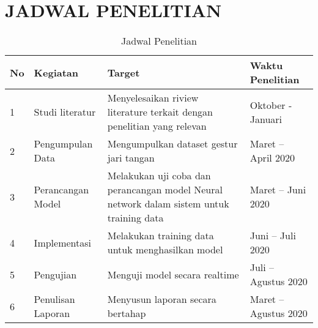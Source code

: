 \chapter{JADWAL PENELITIAN}
\begin{table}[htpb]
	\caption{Jadwal Penelitian}
	\vspace{0.2cm}
	\centering
	\begin{tabular}{|p{0.5cm}|p{4cm}|p{4cm}|p{4cm}|}
		\hline
		No & Kegiatan & Target & Waktu Penelitian \\
		\hline
		1 & Studi literatur & Menyelesaikan riview literature terkait dengan penelitian yang relevan & Oktober - Januari \\ 
		\hline
		2 & Pengumpulan Data & Mengumpulkan dataset gestur jari tangan & Maret  – April 2020\\
		\hline
		3 & Perancangan Model & Melakukan uji coba dan perancangan model Neural network dalam sistem untuk training data & Maret – Juni 2020 \\
		\hline
		4 & Implementasi & Melakukan training data untuk menghasilkan model & Juni – Juli 2020 \\
		\hline
		5 & Pengujian & Menguji model secara realtime & Juli – Agustus 2020 \\
		\hline
		6 & Penulisan  Laporan & Menyusun laporan secara bertahap & Maret – Agustus 2020\\
		\hline
		
	\end{tabular}
\end{table}
